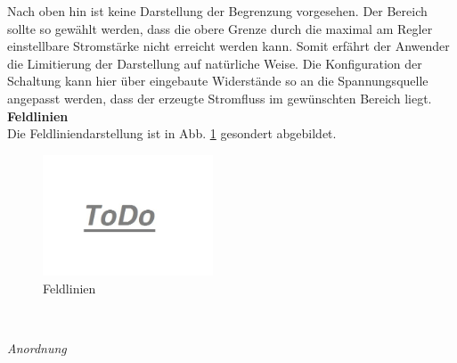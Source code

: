 Nach oben hin ist keine Darstellung der Begrenzung vorgesehen. Der Bereich sollte so gewählt werden, dass die obere Grenze durch die maximal am Regler einstellbare Stromstärke nicht erreicht werden kann. Somit erfährt der Anwender die Limitierung der Darstellung auf natürliche Weise. Die Konfiguration der Schaltung kann hier über eingebaute Widerstände so an die Spannungsquelle angepasst werden, dass der erzeugte Stromfluss im gewünschten Bereich liegt.\\

\textbf{Feldlinien}\\
Die Feldliniendarstellung ist in Abb. \ref{img:mfield-lines} gesondert abgebildet.
\begin{figure}[H]
	\centering
	\includegraphics[width=0.45\textwidth]{images/todo.jpg}
	\caption{Feldlinien}
	\label{img:mfield-lines}
\end{figure}
\vspace{4px}
\begin{center}
	\\
\end{center}
\vspace{6px}
\textit{Anordnung}\\
